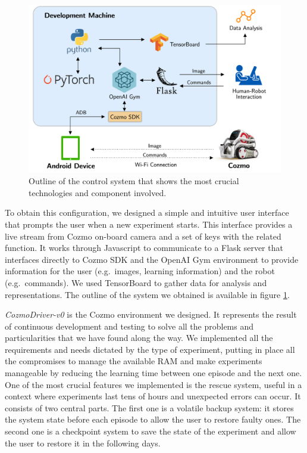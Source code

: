 \documentclass[10pt,twocolumn,letterpaper]{article}
\begin{document}
\begin{figure}[tbp]
    \centering
    \includegraphics[width=0.97\columnwidth]{cozmo-system.png}
    \caption[Outline of the control system]{Outline of the control system that shows the most crucial technologies and component involved.}
    \label{system}
\end{figure}

To obtain this configuration, we designed a simple and intuitive user interface that prompts the user when a new experiment starts.
This interface provides a live stream from Cozmo on-board camera and a set of keys with the related function.
It works through Javascript to communicate to a Flask server that interfaces directly to Cozmo SDK and the OpenAI Gym environment to provide information for the user (e.g.\ images, learning information) and the robot (e.g.\ commands).
We used TensorBoard to gather data for analysis and representations.
The outline of the system we obtained is available in figure \ref{system}.

\textit{CozmoDriver-v0} is the Cozmo environment we designed.
It represents the result of continuous development and testing to solve all the problems and particularities that we have found along the way.
We implemented all the requirements and needs dictated by the type of experiment, putting in place all the compromises to manage the available RAM and make experiments manageable by reducing the learning time between one episode and the next one.
One of the most crucial features we implemented is the rescue system, useful in a context where experiments last tens of hours and unexpected errors can occur.
It consists of two central parts.
The first one is a volatile backup system: it stores the system state before each episode to allow the user to restore faulty ones.
The second one is a checkpoint system to save the state of the experiment and allow the user to restore it in the following days.
%
\end{document}

